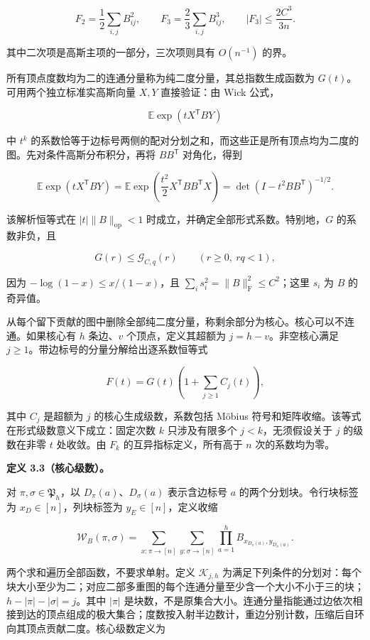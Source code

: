 \documentclass[11pt,a4paper]{article}
\begin{document}
\[
F_2=\frac12\sum_{i,j}B_{ij}^2,
\qquad
F_3=\frac23\sum_{i,j}B_{ij}^3,
\qquad |F_3|\le\frac{2C^3}{3n}.
\]

其中二次项是高斯主项的一部分，三次项则具有 \(O(n^{-1})\) 的界。

所有顶点度数均为二的连通分量称为纯二度分量，其总指数生成函数为 \(G(t)\)。可用两个独立标准实高斯向量 \(X,Y\) 直接验证：由 Wick 公式，

\[
\mathbb E\exp(tX^{\mathsf T}BY)
\]

中 \(t^k\) 的系数恰等于边标号两侧的配对分划之和，而这些正是所有顶点均为二度的图。先对条件高斯分布积分，再将 \(BB^{\mathsf T}\) 对角化，得到

\[
\mathbb E\exp(tX^{\mathsf T}BY)
=\mathbb E\exp\!\left(\frac{t^2}{2}X^{\mathsf T}BB^{\mathsf T}X\right)
=\det(I-t^2BB^{\mathsf T})^{-1/2}.
\]

该解析恒等式在 \(|t|\|B\|_{\mathrm{op}}<1\) 时成立，并确定全部形式系数。特别地，\(G\) 的系数非负，且

\[
G(r)\le\mathcal G_{C,q}(r)\qquad(r\ge0,\ rq<1),
\]

因为 \(-\log(1-x)\le x/(1-x)\)，且 \(\sum_i s_i^2=\|B\|_{\mathrm F}^2\le C^2\)；这里 \(s_i\) 为 \(B\) 的奇异值。

从每个留下贡献的图中删除全部纯二度分量，称剩余部分为核心。核心可以不连通。如果核心有 \(h\) 条边、\(v\) 个顶点，定义其超额为 \(j=h-v\)。非空核心满足 \(j\ge1\)。带边标号的分量分解给出逐系数恒等式

\[
F(t)=G(t)\left(1+\sum_{j\ge1}C_j(t)\right),
\]

其中 \(C_j\) 是超额为 \(j\) 的核心生成级数，系数包括 Möbius 符号和矩阵收缩。该等式在形式级数意义下成立：固定次数 \(k\) 只涉及有限多个 \(j<k\)，无须假设关于 \(j\) 的级数在非零 \(t\) 处收敛。由 \(F_k\) 的互异指标定义，所有高于 \(n\) 次的系数均为零。

\textbf{定义 3.3（核心级数）。}

对 \(\pi,\sigma\in\mathfrak P_h\)，以 \(D_\pi(a)\)、\(D_\sigma(a)\) 表示含边标号 \(a\) 的两个分划块。令行块标签为 \(x_D\in[n]\)，列块标签为 \(y_E\in[n]\)，定义收缩

\[
\mathcal W_B(\pi,\sigma)
=\sum_{x:\pi\to[n]}\sum_{y:\sigma\to[n]}
\prod_{a=1}^hB_{x_{D_\pi(a)},y_{D_\sigma(a)}}.
\]

两个求和遍历全部函数，不要求单射。定义 \(\mathcal K_{j,h}\) 为满足下列条件的分划对：每个块大小至少为二；对应二部多重图的每个连通分量至少含一个大小不小于三的块；\(h-|\pi|-|\sigma|=j\)。其中 \(|\pi|\) 是块数，不是原集合大小。连通分量指能通过边依次相接到达的顶点组成的极大集合；度数按入射半边数计，重边分别计数，压缩后自环向其顶点贡献二度。核心级数定义为
\end{document}
